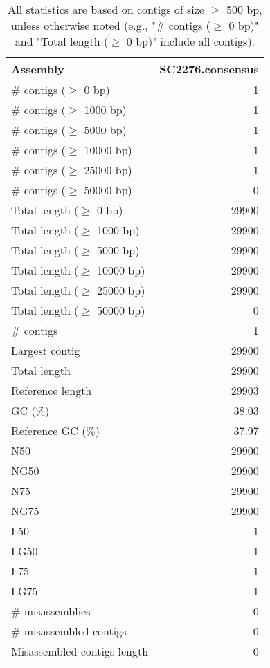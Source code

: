 \documentclass[12pt,a4paper]{article}
\begin{document}
\begin{table}[ht]
\begin{center}
\caption{All statistics are based on contigs of size $\geq$ 500 bp, unless otherwise noted (e.g., "\# contigs ($\geq$ 0 bp)" and "Total length ($\geq$ 0 bp)" include all contigs).}
\begin{tabular}{|l*{1}{|r}|}
\hline
Assembly & SC2276.consensus \\ \hline
\# contigs ($\geq$ 0 bp) & 1 \\ \hline
\# contigs ($\geq$ 1000 bp) & 1 \\ \hline
\# contigs ($\geq$ 5000 bp) & 1 \\ \hline
\# contigs ($\geq$ 10000 bp) & 1 \\ \hline
\# contigs ($\geq$ 25000 bp) & 1 \\ \hline
\# contigs ($\geq$ 50000 bp) & 0 \\ \hline
Total length ($\geq$ 0 bp) & 29900 \\ \hline
Total length ($\geq$ 1000 bp) & 29900 \\ \hline
Total length ($\geq$ 5000 bp) & 29900 \\ \hline
Total length ($\geq$ 10000 bp) & 29900 \\ \hline
Total length ($\geq$ 25000 bp) & 29900 \\ \hline
Total length ($\geq$ 50000 bp) & 0 \\ \hline
\# contigs & 1 \\ \hline
Largest contig & 29900 \\ \hline
Total length & 29900 \\ \hline
Reference length & 29903 \\ \hline
GC (\%) & 38.03 \\ \hline
Reference GC (\%) & 37.97 \\ \hline
N50 & 29900 \\ \hline
NG50 & 29900 \\ \hline
N75 & 29900 \\ \hline
NG75 & 29900 \\ \hline
L50 & 1 \\ \hline
LG50 & 1 \\ \hline
L75 & 1 \\ \hline
LG75 & 1 \\ \hline
\# misassemblies & 0 \\ \hline
\# misassembled contigs & 0 \\ \hline
Misassembled contigs length & 0 \\ \hline

\end{tabular}
\end{center}
\end{table}
\end{document}
